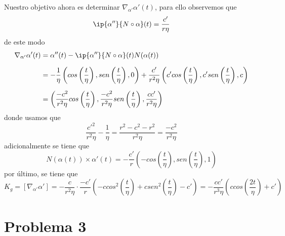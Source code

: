 \documentclass{article}
\begin{document}
Nuestro objetivo ahora es determinar $\nabla_{\alpha'}\alpha'(t)$, para ello observemos que
\begin{equation*}
    \ip{\alpha''}{N\circ\alpha}(t)=\frac{c'}{r\eta}
\end{equation*}
de este modo
\begin{align*}
    \nabla_{\alpha'}\alpha'(t) &= \alpha''(t)-\ip{\alpha''}{N\circ\alpha}(t)N(\alpha(t)) \\[2mm]
    &= -\frac{1}{\eta}\left(cos\left(\frac{t}{\eta}\right),
    sen\left(\frac{t}{\eta}\right),0\right)+\frac{c'}{r^{2}\eta}
    \left(c'cos\left(\frac{t}{\eta}\right),c'sen\left(\frac{t}{\eta}\right),c\right) \\[2mm]
    &= \left(\frac{-c^{2}}{r^{2}\eta}cos\left(\frac{t}{\eta}\right),
    \frac{-c^{2}}{r^{2}\eta}sen\left(\frac{t}{\eta}\right),\frac{cc'}{r^{2}\eta}\right)
\end{align*}
donde usamos que
\begin{equation*}
    \frac{c'^{2}}{r^{2}\eta}-\frac{1}{\eta}=\frac{r^{2}-c^{2}-r^{2}}{r^{2}\eta}
    =\frac{-c^{2}}{r^{2}\eta}
\end{equation*}
adicionalmente se tiene que
\begin{equation*}
    N(\alpha(t))\times\alpha'(t)=-\frac{c'}{r}\left(-cos\left(\frac{t}{\eta}\right),
    sen\left(\frac{t}{\eta}\right),1\right)
\end{equation*}
por último, se tiene que
\begin{equation*}
    K_{g}=[\nabla_{\alpha'}\alpha']=-\frac{c}{r^{2}\eta}\cdot\frac{-c'}{r}\left(-ccos^{2}
    \left(\frac{t}{\eta}\right)+csen^{2}\left(\frac{t}{\eta}\right)-c'\right)
    =-\frac{cc'}{r^{3}\eta}\left(ccos\left(\frac{2t}{\eta}\right)+c'\right)
\end{equation*}

\section*{Problema 3}
\end{document}
